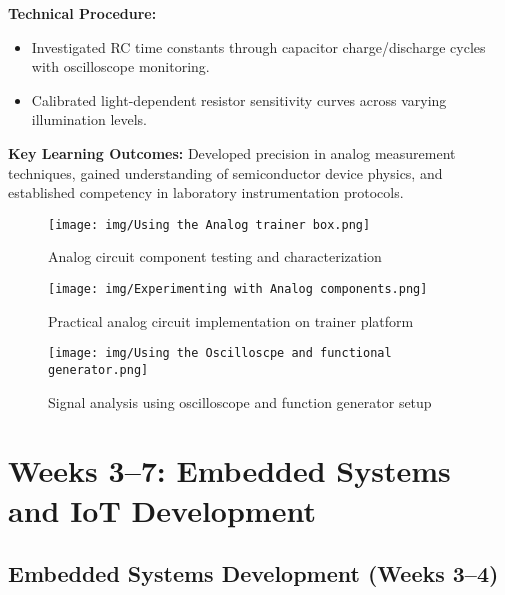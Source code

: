 \documentclass[12pt,a4paper]{report}
\begin{document}
\noindent\textbf{Technical Procedure:}
\begin{itemize}
    \item Investigated RC time constants through capacitor charge/discharge cycles with oscilloscope monitoring.
    \item Calibrated light-dependent resistor sensitivity curves across varying illumination levels.
\end{itemize}

\noindent\textbf{Key Learning Outcomes:} Developed precision in analog measurement techniques, gained understanding of semiconductor device physics, and established competency in laboratory instrumentation protocols.

\begin{figure}[H]
\centering
\begin{minipage}[t]{0.49\textwidth}
  \centering
  \texttt{[image: img/Using the Analog trainer box.png]}
  \caption{Analog circuit component testing and characterization}
  \label{fig:analog-components}
\end{minipage}
\hfill
\begin{minipage}[t]{0.49\textwidth}
  \centering
  \texttt{[image: img/Experimenting with Analog components.png]}
  \caption{Practical analog circuit implementation on trainer platform}
  \label{fig:analog-trainer}
\end{minipage}

\vspace{4em}

\begin{minipage}[t]{0.98\textwidth}
  \centering
  \texttt{[image: img/Using the Oscilloscpe and functional generator.png]}
  \caption{Signal analysis using oscilloscope and function generator setup}
  \label{fig:oscilloscope-setup}
\end{minipage}
\end{figure}

\newpage
\section{Weeks 3--7: Embedded Systems and IoT Development}

\subsection{Embedded Systems Development (Weeks 3--4)}
\end{document}
